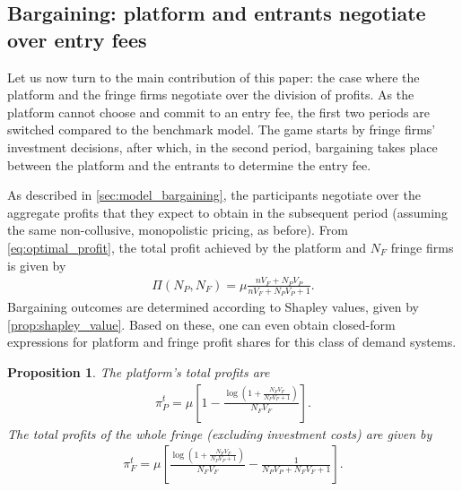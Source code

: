\documentclass[a4paper]{article}
\newtheorem{proposition}{Proposition}
\begin{document}
\subsection{Bargaining: platform and entrants negotiate over entry fees}

Let us now turn to the main contribution of this paper: the case where the platform and the fringe firms negotiate over the division of profits.
As the platform cannot choose and commit to an entry fee, the first two periods are switched compared to the benchmark model.
The game starts by fringe firms' investment decisions, after which, in the second period, bargaining takes place between the platform and the entrants to determine the entry fee.

As described in \cref{sec:model_bargaining}, the participants negotiate over the aggregate profits that they expect to obtain in the subsequent period (assuming the same non-collusive, monopolistic pricing, as before).
From \cref{eq:optimal_profit}, the total profit achieved by the platform and $N_F$ fringe firms is given by
\begin{align*}
    \Pi(N_P, N_F) = \mu \frac{n V_F + N_P V_P}{n V_F + N_P V_P + 1}.
\end{align*}
Bargaining outcomes are determined according to Shapley values, given by \cref{prop:shapley_value}.
Based on these, one can even obtain closed-form expressions for platform and fringe profit shares for this class of demand systems.
\begin{proposition}
    \label{prop:platform_profits_bargaining}
    The platform's total profits are
    \begin{align*}
        \pi^t_P = \mu \left[ 1 - \frac{\log \left(1 + \frac{N_F V_F}{N_P V_P + 1} \right)}{N_F V_F} \right].
    \end{align*}
    The total profits of the whole fringe (excluding investment costs) are given by
    \begin{align*}
        \pi^t_F = \mu \left[ \frac{\log \left( 1 + \frac{N_F V_F}{N_P V_P + 1} \right)}{N_F V_F} - \frac{1}{N_P V_P + N_F V_F + 1} \right].
    \end{align*}
\end{proposition}
\end{document}
